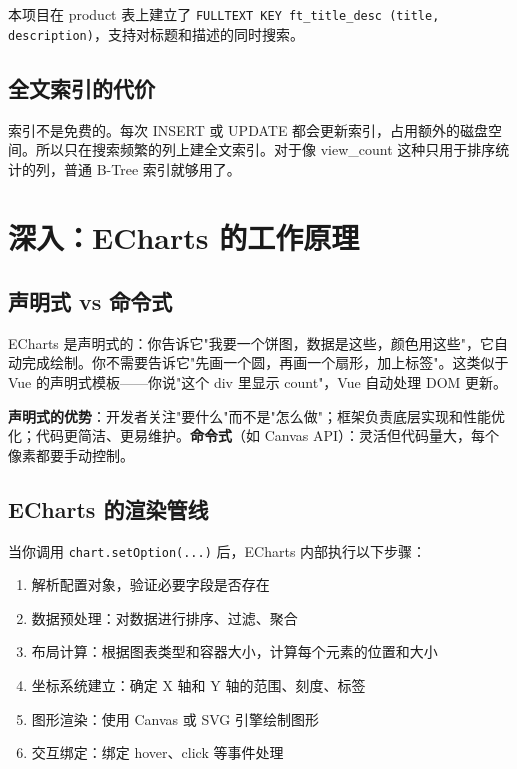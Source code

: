 \documentclass[12pt,a4paper]{ctexart}
\begin{document}
本项目在 product 表上建立了 \texttt{FULLTEXT KEY ft\_title\_desc (title, description)}，支持对标题和描述的同时搜索。

\subsection{全文索引的代价}

索引不是免费的。每次 INSERT 或 UPDATE 都会更新索引，占用额外的磁盘空间。所以只在搜索频繁的列上建全文索引。对于像 view\_count 这种只用于排序统计的列，普通 B-Tree 索引就够用了。

\section{深入：ECharts 的工作原理}

\subsection{声明式 vs 命令式}

ECharts 是声明式的：你告诉它"我要一个饼图，数据是这些，颜色用这些"，它自动完成绘制。你不需要告诉它"先画一个圆，再画一个扇形，加上标签"。这类似于 Vue 的声明式模板——你说"这个 div 里显示 count"，Vue 自动处理 DOM 更新。

\textbf{声明式的优势}：开发者关注"要什么"而不是"怎么做"；框架负责底层实现和性能优化；代码更简洁、更易维护。\textbf{命令式}（如 Canvas API）：灵活但代码量大，每个像素都要手动控制。

\subsection{ECharts 的渲染管线}

当你调用 \texttt{chart.setOption(...)} 后，ECharts 内部执行以下步骤：
\begin{enumerate}
  \item 解析配置对象，验证必要字段是否存在
  \item 数据预处理：对数据进行排序、过滤、聚合
  \item 布局计算：根据图表类型和容器大小，计算每个元素的位置和大小
  \item 坐标系统建立：确定 X 轴和 Y 轴的范围、刻度、标签
  \item 图形渲染：使用 Canvas 或 SVG 引擎绘制图形
  \item 交互绑定：绑定 hover、click 等事件处理
\end{enumerate}
\end{document}
